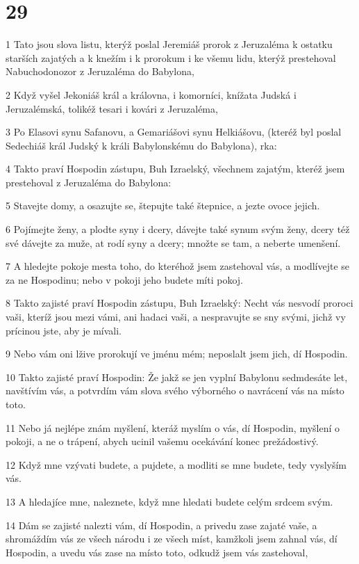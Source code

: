 \chapter{29}

\par 1 Tato jsou slova listu, kterýž poslal Jeremiáš prorok z Jeruzaléma k ostatku starších zajatých a k knežím i k prorokum i ke všemu lidu, kterýž prestehoval Nabuchodonozor z Jeruzaléma do Babylona,
\par 2 Když vyšel Jekoniáš král a královna, i komorníci, knížata Judská i Jeruzalémská, tolikéž tesari i kovári z Jeruzaléma,
\par 3 Po Elasovi synu Safanovu, a Gemariášovi synu Helkiášovu, (kteréž byl poslal Sedechiáš král Judský k králi Babylonskému do Babylona), rka:
\par 4 Takto praví Hospodin zástupu, Buh Izraelský, všechnem zajatým, kteréž jsem prestehoval z Jeruzaléma do Babylona:
\par 5 Stavejte domy, a osazujte se, štepujte také štepnice, a jezte ovoce jejich.
\par 6 Pojímejte ženy, a plodte syny i dcery, dávejte také synum svým ženy, dcery též své dávejte za muže, at rodí syny a dcery; množte se tam, a neberte umenšení.
\par 7 A hledejte pokoje mesta toho, do kteréhož jsem zastehoval vás, a modlívejte se za ne Hospodinu; nebo v pokoji jeho budete míti pokoj.
\par 8 Takto zajisté praví Hospodin zástupu, Buh Izraelský: Necht vás nesvodí proroci vaši, kteríž jsou mezi vámi, ani hadaci vaši, a nespravujte se sny svými, jichž vy prícinou jste, aby je mívali.
\par 9 Nebo vám oni lžive prorokují ve jménu mém; neposlalt jsem jich, dí Hospodin.
\par 10 Takto zajisté praví Hospodin: Že jakž se jen vyplní Babylonu sedmdesáte let, navštívím vás, a potvrdím vám slova svého výborného o navrácení vás na místo toto.
\par 11 Nebo já nejlépe znám myšlení, kteráž myslím o vás, dí Hospodin, myšlení o pokoji, a ne o trápení, abych ucinil vašemu ocekávání konec prežádostivý.
\par 12 Když mne vzývati budete, a pujdete, a modliti se mne budete, tedy vyslyším vás.
\par 13 A hledajíce mne, naleznete, když mne hledati budete celým srdcem svým.
\par 14 Dám se zajisté nalezti vám, dí Hospodin, a privedu zase zajaté vaše, a shromáždím vás ze všech národu i ze všech míst, kamžkoli jsem zahnal vás, dí Hospodin, a uvedu vás zase na místo toto, odkudž jsem vás zastehoval,
